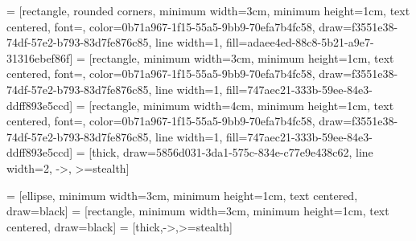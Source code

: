  = [rectangle, rounded corners, minimum width=3cm, minimum height=1cm, text centered, font=\normalsize, color=0b71a967-1f15-55a5-9bb9-70efa7b4fc58, draw=f3551e38-74df-57e2-b793-83d7fe876c85, line width=1, fill=adaee4ed-88c8-5b21-a9e7-31316ebef86f]
 = [rectangle, minimum width=3cm, minimum height=1cm, text centered, font=\normalsize, color=0b71a967-1f15-55a5-9bb9-70efa7b4fc58, draw=f3551e38-74df-57e2-b793-83d7fe876c85, line width=1, fill=747aec21-333b-59ee-84e3-ddff893e5ccd]
 = [rectangle, minimum width=4cm, minimum height=1cm, text centered, font=\normalsize, color=0b71a967-1f15-55a5-9bb9-70efa7b4fc58, draw=f3551e38-74df-57e2-b793-83d7fe876c85, line width=1, fill=747aec21-333b-59ee-84e3-ddff893e5ccd]
 = [thick, draw=5856d031-3da1-575c-834e-c77e9e438c62, line width=2, ->, >=stealth]


 = [ellipse, minimum width=3cm, minimum height=1cm, text centered, draw=black]
 = [rectangle, minimum width=3cm, minimum height=1cm, text centered, draw=black]
 = [thick,->,>=stealth]
